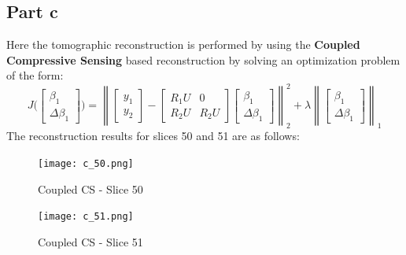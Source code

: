 \documentclass[12pt]{article}
\newcommand{\norm}[1]{\left\lVert #1 \right\rVert}
\begin{document}
\subsection*{Part c}
Here the tomographic reconstruction is performed by using the \textbf{Coupled Compressive Sensing} based reconstruction by solving an optimization problem of the form:
$$J\bigg(\begin{bmatrix}
\beta_1 \\ \Delta \beta_1
\end{bmatrix}\bigg) = \norm{\begin{bmatrix}
	y_1\\y_2
	\end{bmatrix} - \begin{bmatrix}
	R_1U & 0\\
	R_2U & R_2U
	\end{bmatrix} \begin{bmatrix}
	\beta_1 \\ \Delta \beta_1
	\end{bmatrix}}_2^2 + \lambda \norm{\begin{bmatrix}
	\beta_1 \\ \Delta \beta_1
	\end{bmatrix}}_1$$
The reconstruction results for slices 50 and 51 are as follows:
\begin{figure}[ht]
	\centering
	\begin{minipage}[bt]{0.5\linewidth}
		\centering
		\texttt{[image: c\_50.png]}
		\caption{Coupled CS - Slice 50}
	\end{minipage}
	\begin{minipage}[bt]{0.4\linewidth}
		\centering
		\texttt{[image: c\_51.png]}
		\caption{Coupled CS - Slice 51}
	\end{minipage}
\end{figure}
\end{document}
